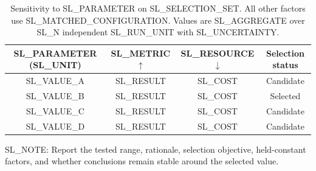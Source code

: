 \begin{table}[t]
  \centering
  \small
  \caption{Sensitivity to SL_PARAMETER on SL_SELECTION_SET. All other factors
  use SL_MATCHED_CONFIGURATION. Values are SL_AGGREGATE over SL_N independent
  SL_RUN_UNIT with SL_UNCERTAINTY.}
  \label{tab:SL_LABEL}
  \begin{tabular}{cccc}
    \toprule
    SL_PARAMETER (SL_UNIT) & SL_METRIC $\uparrow$ & SL_RESOURCE $\downarrow$ &
    Selection status \\
    \midrule
    SL_VALUE_A & SL_RESULT & SL_COST & Candidate \\
    SL_VALUE_B & SL_RESULT & SL_COST & Selected \\
    SL_VALUE_C & SL_RESULT & SL_COST & Candidate \\
    SL_VALUE_D & SL_RESULT & SL_COST & Candidate \\
    \bottomrule
  \end{tabular}

  \parbox{0.98\linewidth}{\footnotesize
  SL_NOTE: Report the tested range, rationale, selection objective, held-constant
  factors, and whether conclusions remain stable around the selected value.}
\end{table}
